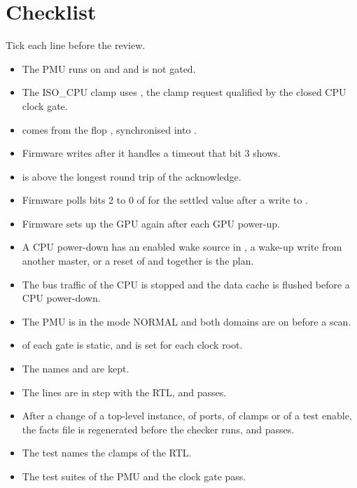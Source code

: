 \section{Checklist}\label{um:ch:power-integration:checklist}
Tick each line before the review.
\begin{itemize}
  \item[$\square$] The PMU runs on  and  and is not gated.
  \item[$\square$] The ISO\_CPU clamp uses , the clamp request qualified by the closed CPU clock gate.
  \item[$\square$]  comes from the flop , synchronised into .
  \item[$\square$] Firmware writes  after it handles a timeout that  bit 3 shows.
  \item[$\square$]  is above the longest round trip of the acknowledge.
  \item[$\square$] Firmware polls bits 2 to 0 of  for the settled value after a write to .
  \item[$\square$] Firmware sets up the GPU again after each GPU power-up.
  \item[$\square$] A CPU power-down has an enabled wake source in , a wake-up write from another master, or a reset of  and  together is the plan.
  \item[$\square$] The bus traffic of the CPU is stopped and the data cache is flushed before a CPU power-down.
  \item[$\square$] The PMU is in the mode NORMAL and both domains are on before a scan.
  \item[$\square$]  of each gate is static, and  is set for each clock root.
  \item[$\square$] The names  and  are kept.
  \item[$\square$] The  lines are in step with the RTL, and  passes.
  \item[$\square$] After a change of a top-level instance, of ports, of clamps or of a test enable, the facts file is regenerated before the checker runs, and  passes.
  \item[$\square$] The test  names the clamps of the RTL.
  \item[$\square$] The test suites of the PMU and the clock gate pass.
\end{itemize}
